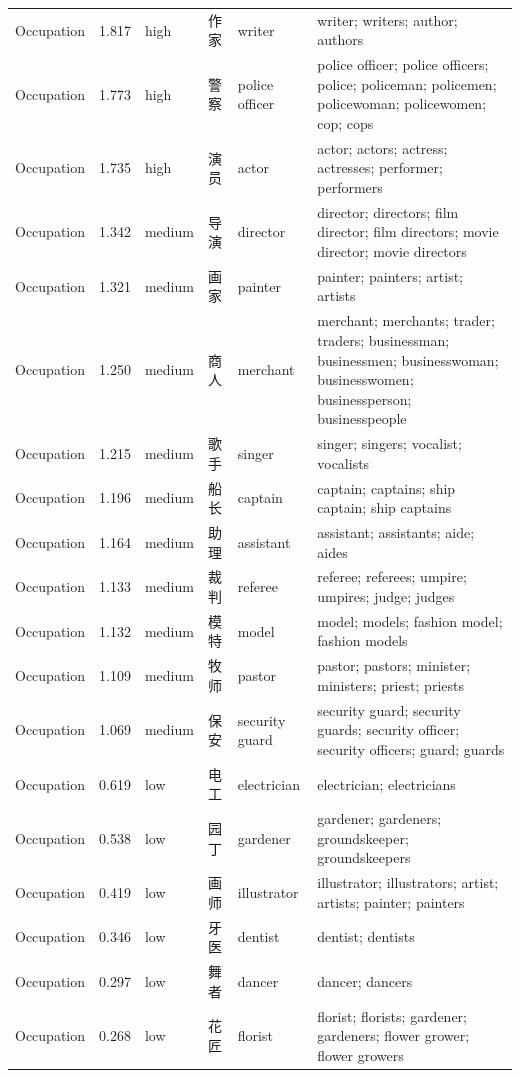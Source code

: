 {\begin{longtable}[c]{@{}>{\raggedright\arraybackslash}p{1.85cm}l l l>{\raggedright\arraybackslash}p{1.85cm}>{\raggedright\arraybackslash}p{8.10cm}@{}}
Occupation & 1.817 & high & 作家 & writer & writer; writers; author; authors \\
Occupation & 1.773 & high & 警察 & police officer & police officer; police officers; police; policeman; policemen; policewoman; policewomen; cop; cops \\
Occupation & 1.735 & high & 演员 & actor & actor; actors; actress; actresses; performer; performers \\
Occupation & 1.342 & medium & 导演 & director & director; directors; film director; film directors; movie director; movie directors \\
Occupation & 1.321 & medium & 画家 & painter & painter; painters; artist; artists \\
Occupation & 1.250 & medium & 商人 & merchant & merchant; merchants; trader; traders; businessman; businessmen; businesswoman; businesswomen; businessperson; businesspeople \\
Occupation & 1.215 & medium & 歌手 & singer & singer; singers; vocalist; vocalists \\
Occupation & 1.196 & medium & 船长 & captain & captain; captains; ship captain; ship captains \\
Occupation & 1.164 & medium & 助理 & assistant & assistant; assistants; aide; aides \\
Occupation & 1.133 & medium & 裁判 & referee & referee; referees; umpire; umpires; judge; judges \\
Occupation & 1.132 & medium & 模特 & model & model; models; fashion model; fashion models \\
Occupation & 1.109 & medium & 牧师 & pastor & pastor; pastors; minister; ministers; priest; priests \\
Occupation & 1.069 & medium & 保安 & security guard & security guard; security guards; security officer; security officers; guard; guards \\
Occupation & 0.619 & low & 电工 & electrician & electrician; electricians \\
Occupation & 0.538 & low & 园丁 & gardener & gardener; gardeners; groundskeeper; groundskeepers \\
Occupation & 0.419 & low & 画师 & illustrator & illustrator; illustrators; artist; artists; painter; painters \\
Occupation & 0.346 & low & 牙医 & dentist & dentist; dentists \\
Occupation & 0.297 & low & 舞者 & dancer & dancer; dancers \\
Occupation & 0.268 & low & 花匠 & florist & florist; florists; gardener; gardeners; flower grower; flower growers \\

\end{longtable}}

